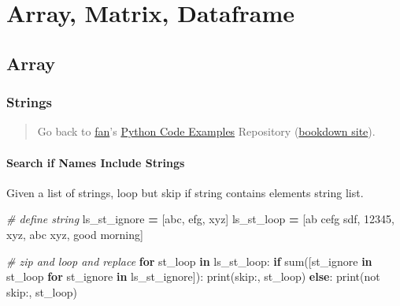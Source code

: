 \documentclass[
]{book}
\newenvironment{Shaded}{\begin{snugshade}}{\end{snugshade}}
\newcommand{\BuiltInTok}[1]{#1}
\newcommand{\CommentTok}[1]{\textcolor[rgb]{0.56,0.35,0.01}{\textit{#1}}}
\newcommand{\ControlFlowTok}[1]{\textcolor[rgb]{0.13,0.29,0.53}{\textbf{#1}}}
\newcommand{\KeywordTok}[1]{\textcolor[rgb]{0.13,0.29,0.53}{\textbf{#1}}}
\newcommand{\NormalTok}[1]{#1}
\newcommand{\OperatorTok}[1]{\textcolor[rgb]{0.81,0.36,0.00}{\textbf{#1}}}
\newcommand{\StringTok}[1]{\textcolor[rgb]{0.31,0.60,0.02}{#1}}
\begin{document}
\hypertarget{array-matrix-dataframe}{%
\chapter{Array, Matrix, Dataframe}\label{array-matrix-dataframe}}

\hypertarget{array}{%
\section{Array}\label{array}}

\hypertarget{strings}{%
\subsection{Strings}\label{strings}}

\begin{quote}
Go back to \href{http://fanwangecon.github.io/}{fan}'s \href{https://fanwangecon.github.io/pyfan/}{Python Code Examples} Repository (\href{https://fanwangecon.github.io/pyfan/bookdown}{bookdown site}).
\end{quote}

\hypertarget{search-if-names-include-strings}{%
\subsubsection{Search if Names Include Strings}\label{search-if-names-include-strings}}

Given a list of strings, loop but skip if string contains elements string list.

\begin{Shaded}
\begin{Highlighting}[]
\CommentTok{\# define string}
\NormalTok{ls\_st\_ignore }\OperatorTok{=}\NormalTok{ [}\StringTok{\textquotesingle{}abc\textquotesingle{}}\NormalTok{, }\StringTok{\textquotesingle{}efg\textquotesingle{}}\NormalTok{, }\StringTok{\textquotesingle{}xyz\textquotesingle{}}\NormalTok{]}
\NormalTok{ls\_st\_loop }\OperatorTok{=}\NormalTok{ [}\StringTok{\textquotesingle{}ab cefg sdf\textquotesingle{}}\NormalTok{, }\StringTok{\textquotesingle{}12345\textquotesingle{}}\NormalTok{, }\StringTok{\textquotesingle{}xyz\textquotesingle{}}\NormalTok{, }\StringTok{\textquotesingle{}abc xyz\textquotesingle{}}\NormalTok{, }\StringTok{\textquotesingle{}good morning\textquotesingle{}}\NormalTok{]}

\CommentTok{\# zip and loop and replace}
\ControlFlowTok{for}\NormalTok{ st\_loop }\KeywordTok{in}\NormalTok{ ls\_st\_loop:}
  \ControlFlowTok{if} \BuiltInTok{sum}\NormalTok{([st\_ignore }\KeywordTok{in}\NormalTok{ st\_loop }\ControlFlowTok{for}\NormalTok{ st\_ignore }\KeywordTok{in}\NormalTok{ ls\_st\_ignore]):}
    \BuiltInTok{print}\NormalTok{(}\StringTok{\textquotesingle{}skip:\textquotesingle{}}\NormalTok{, st\_loop)}
  \ControlFlowTok{else}\NormalTok{:}
    \BuiltInTok{print}\NormalTok{(}\StringTok{\textquotesingle{}not skip:\textquotesingle{}}\NormalTok{, st\_loop)}
\end{Highlighting}
\end{Shaded}
\end{document}
